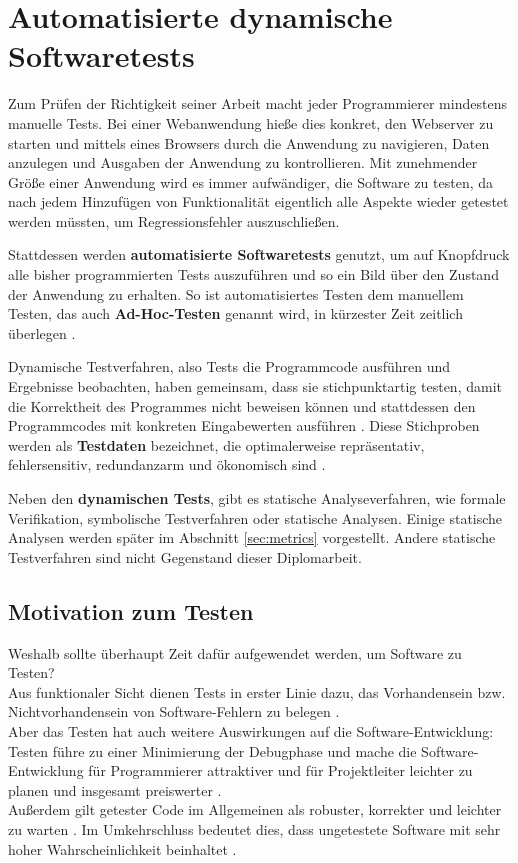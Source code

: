 \chapter{Automatisierte dynamische Softwaretests}
\label{sec:test}
Zum Prüfen der Richtigkeit seiner Arbeit macht jeder Programmierer mindestens manuelle Tests. Bei einer Webanwendung hieße dies konkret, den Webserver zu starten und mittels eines Browsers durch die Anwendung zu navigieren, Daten anzulegen und Ausgaben der Anwendung zu kontrollieren. Mit zunehmender Größe einer Anwendung wird es immer aufwändiger, die Software zu testen, da nach jedem Hinzufügen von Funktionalität eigentlich alle Aspekte wieder getestet werden müssten, um Regressionsfehler auszuschließen.

Stattdessen werden \textbf{automatisierte Softwaretests} genutzt, um auf Knopfdruck alle bisher programmierten Tests auszuführen und so ein Bild über den Zustand der Anwendung zu erhalten. So ist automatisiertes Testen dem manuellem Testen, das auch \textbf{Ad-Hoc-Testen} genannt wird, in kürzester Zeit zeitlich überlegen \citep{rappin_rails_2011}.

Dynamische Testverfahren, also Tests die Programmcode ausführen und Ergebnisse beobachten, haben gemeinsam, dass sie stichpunktartig testen, damit die Korrektheit des Programmes nicht beweisen können und stattdessen den Programmcodes mit konkreten Eingabewerten ausführen \citep[S. 49]{liggesmeyer_modultest_1990}. Diese Stichproben werden als \textbf{Testdaten} bezeichnet, die optimalerweise repräsentativ, fehlersensitiv, redundanzarm und ökonomisch sind \citep[S. 51]{liggesmeyer_modultest_1990}.

Neben den \textbf{dynamischen Tests}, gibt es statische Analyseverfahren, wie formale Verifikation, symbolische Testverfahren oder statische Analysen. Einige statische Analysen werden später im Abschnitt \ref{sec:metrics} vorgestellt. Andere statische Testverfahren sind nicht Gegenstand dieser Diplomarbeit.

\section{Motivation zum Testen}
Weshalb sollte überhaupt Zeit dafür aufgewendet werden, um Software zu Testen?\\
Aus funktionaler Sicht dienen Tests in erster Linie dazu, das Vorhandensein bzw. Nichtvorhandensein von Software-Fehlern zu belegen \citep{goodliffe_code_2006}.\\
Aber das Testen hat auch weitere Auswirkungen auf die Software-Entwicklung: Testen führe zu einer Minimierung der Debugphase und mache die Software\hyp{}Entwicklung für Programmierer attraktiver und für Projektleiter leichter zu planen \citep{orsini_rails_2007} und insgesamt preiswerter \citep[S.13]{liggesmeyer_modultest_1990}.\\
Außerdem gilt getester Code im Allgemeinen als robuster, korrekter und leichter zu warten \citep{rappin_rails_2011}. Im Umkehrschluss bedeutet dies, dass ungetestete Software mit sehr hoher Wahrscheinlichkeit  beinhaltet \citep{goodliffe_code_2006}.

